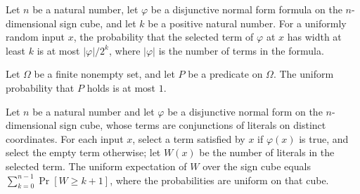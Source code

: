 \begin{theorem}
\label{FABL.selectedWidth_tail_probability_le}
\leanok
{}
Let $n$ be a natural number, let $\varphi$ be a disjunctive normal form formula on the
$n$-dimensional sign cube, and let $k$ be a positive natural number. For a uniformly
random input $x$, the probability that the selected term of $\varphi$ at $x$ has width
at least $k$ is at most $|\varphi|/2^k$, where $|\varphi|$ is the number of terms in the
formula.
\end{theorem}

\begin{theorem}
\label{FABL.uniformProbability_le_one}
\leanok
{}
Let $\Omega$ be a finite nonempty set, and let $P$ be a predicate on $\Omega$. The
uniform probability that $P$ holds is at most $1$.
\end{theorem}

\begin{theorem}
\label{FABL.expect_selectedWidth_eq_sum_tail}
\leanok
{}
Let $n$ be a natural number and let $\varphi$ be a disjunctive normal form on the
$n$-dimensional sign cube, whose terms are conjunctions of literals on distinct
coordinates. For each input $x$, select a term satisfied by $x$ if $\varphi(x)$ is true,
and select the empty term otherwise; let $W(x)$ be the number of literals in the
selected term. The uniform expectation of $W$ over the sign cube equals
$\sum_{k=0}^{n-1}\Pr[W\ge k+1]$, where the probabilities are uniform on that cube.
\end{theorem}

